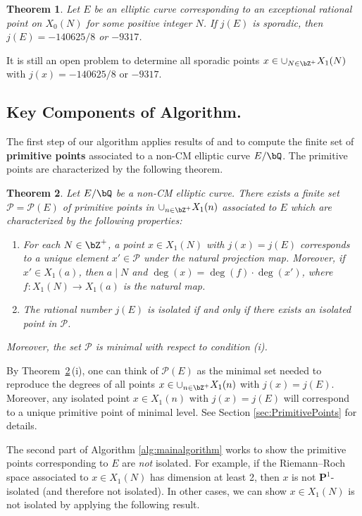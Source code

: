 \documentclass[11pt,reqno]{amsart}
\theoremstyle{plain}
\newtheorem{theorem}{Theorem}%
\theoremstyle{definition}
\newcommand{\Q}{\bQ}
\newcommand{\Z}{\bZ}
\newcommand{\PP}{\mathbf P}
\begin{document}
\begin{theorem}
Let $E$ be an elliptic curve corresponding to an exceptional rational point on $X_0(N)$ for some positive integer $N$. If $j(E)$ is sporadic, then $j(E)=-140625/8$ or $-9317$.
\end{theorem}

It is still an open problem to determine all sporadic points $x \in \cup_{N \in \Z^+} X_1(N)$ with $j(x) =-140625/8$ or $-9317$.

\subsection{Key Components of Algorithm.} The first step of our algorithm applies results of \cite{BELOV} and \cite{ZywinaAlgorithm} to compute the finite set of \textbf{primitive points} associated to a non-CM elliptic curve $E/\Q$. The primitive points are characterized by the following theorem. 
\begin{theorem}\label{Thm:PrimPtsIntro}
Let $E/\Q$ be a non-CM elliptic curve.  There exists a finite set $\mathcal{P}=\mathcal{P}(E)$ of primitive points in $\cup_{n \in \Z^+} X_1(n)$ associated to $E$ which are characterized by the following properties:
\begin{enumerate}
\item For each $N\in \Z^+$, a point $x \in X_1(N)$ with $j(x)=j(E)$ corresponds to a unique element $x' \in \mathcal{P}$ under the natural projection map. Moreover, if $x' \in X_1(a)$, then $a \mid N$ and $\deg(x)=\deg(f)\cdot \deg(x')$, where $f\colon X_1(N) \rightarrow X_1(a)$ is the natural map.
\item The rational number $j(E)$ is isolated if and only if there exists an isolated point in $\mathcal{P}$.
\end{enumerate}
Moreover, the set $\mathcal{P}$ is minimal with respect to condition (i).
\end{theorem} 

\noindent By Theorem~\ref{Thm:PrimPtsIntro}\,(i), one can think of $\mathcal{P}(E)$ as the minimal set needed to reproduce the degrees of all points $x \in \cup_{n \in \Z^+} X_1(n)$ with $j(x) = j(E)$. Moreover, any isolated point $x \in X_1(n)$ with $j(x)=j(E)$ will correspond to a unique primitive point of minimal level. See Section \ref{sec:PrimitivePoints} for details.

The second part of Algorithm \ref{alg:mainalgorithm} works to show the primitive points corresponding to $E$ are \emph{not} isolated. For example, if the Riemann--Roch space associated to $x \in X_1(N)$ has dimension at least 2, then $x$ is not $\PP^1$-isolated (and therefore not isolated). In other cases, we can show $x \in X_1(N)$ is not isolated by applying the following result.
\end{document}
